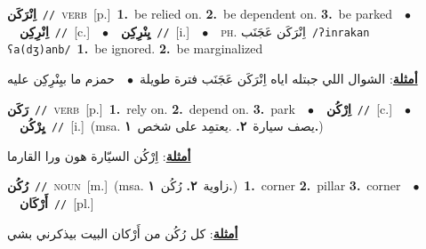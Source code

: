 \documentclass[10pt,a4paper,twoside]{article} %
\begin{document}
\begin{multicols}{2}
{\setlength\topsep{0pt}\textbf{\foreignlanguage{arabic}{اِنْرَكَن}}\ {\color{gray}\texttt{//}\color{black}}\ \textsc{verb}\ [p.]\ \textbf{1.}~be relied on.  \textbf{2.}~be dependent on.  \textbf{3.}~be parked\ \ $\bullet$\ \ \setlength\topsep{0pt}\textbf{\foreignlanguage{arabic}{اِنْرِكِن}}\ {\color{gray}\texttt{//}\color{black}}\ [c.]\ \ $\bullet$\ \ \setlength\topsep{0pt}\textbf{\foreignlanguage{arabic}{يِنْرِكِن}}\ {\color{gray}\texttt{//}\color{black}}\ [i.]\ \ $\bullet$\ \ \textsc{ph.} \color{gray} \foreignlanguage{arabic}{اِنْرَكَن عَجَنَب}\color{black}\ {\color{gray}\texttt{/{\sffamily ʔinrakan ʕa(dʒ)anb}/}\color{black}}\ \textbf{1.}~be ignored.  \textbf{2.}~be marginalized\  \begin{flushright}\color{gray}\foreignlanguage{arabic}{\textbf{\underline{\foreignlanguage{arabic}{أمثلة}}}: الشوال اللي جبتله اياه اِنْرَكَن عَجَنَب فترة طويلة\ $\bullet$\ \  حمزم ما بيِنْرِكِن عليه}\end{flushright}\color{black}} \vspace{2mm}

{\setlength\topsep{0pt}\textbf{\foreignlanguage{arabic}{رَكَن}}\ {\color{gray}\texttt{//}\color{black}}\ \textsc{verb}\ [p.]\ \textbf{1.}~rely on.  \textbf{2.}~depend on.  \textbf{3.}~park\ \ $\bullet$\ \ \setlength\topsep{0pt}\textbf{\foreignlanguage{arabic}{اِرْكُن}}\ {\color{gray}\texttt{//}\color{black}}\ [c.]\ \ $\bullet$\ \ \setlength\topsep{0pt}\textbf{\foreignlanguage{arabic}{يِرْكُن}}\ {\color{gray}\texttt{//}\color{black}}\ [i.]\ \color{gray}(msa. \foreignlanguage{arabic}{يصف سيارة}~\foreignlanguage{arabic}{\textbf{٢.}}  .\foreignlanguage{arabic}{يعتمِد على شخص}~\foreignlanguage{arabic}{\textbf{١.}})\color{black}\  \begin{flushright}\color{gray}\foreignlanguage{arabic}{\textbf{\underline{\foreignlanguage{arabic}{أمثلة}}}: اِرْكُن السيّارة هون ورا القارما}\end{flushright}\color{black}} \vspace{2mm}

{\setlength\topsep{0pt}\textbf{\foreignlanguage{arabic}{رُكُن}}\ {\color{gray}\texttt{//}\color{black}}\ \textsc{noun}\ [m.]\ \color{gray}(msa. \foreignlanguage{arabic}{زاوية}~\foreignlanguage{arabic}{\textbf{٢.}}  \foreignlanguage{arabic}{رُكُن}~\foreignlanguage{arabic}{\textbf{١.}})\color{black}\ \textbf{1.}~corner  \textbf{2.}~pillar  \textbf{3.}~corner\ \ $\bullet$\ \ \setlength\topsep{0pt}\textbf{\foreignlanguage{arabic}{أَرْكَان}}\ {\color{gray}\texttt{//}\color{black}}\ [pl.]\  \begin{flushright}\color{gray}\foreignlanguage{arabic}{\textbf{\underline{\foreignlanguage{arabic}{أمثلة}}}: كل رُكُن من أَرْكان البيت بيذكرني بشي}\end{flushright}\color{black}} \vspace{2mm}


\end{multicols}
\end{document}
